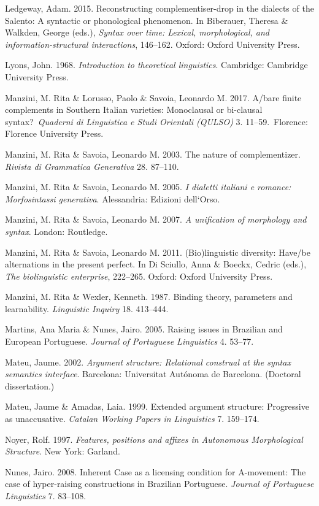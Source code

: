 \documentclass[output=paper]{langsci/langscibook}
\begin{document}
Ledgeway, Adam. 2015. Reconstructing complementiser-drop in the dialects of the Salento: A syntactic or phonological phenomenon. In Biberauer, Theresa \& Walkden, George (eds.), \textit{Syntax over time: Lexical, morphological, and information-structural interactions}, 146–162. Oxford: Oxford University Press.

Lyons, John. 1968. \textit{Introduction to theoretical linguistics}. Cambridge: Cambridge University Press.

Manzini, M. Rita \& Lorusso, Paolo \& Savoia, Leonardo M. 2017. A/bare finite complements in Southern Italian varieties: Monoclausal or bi-clausal syntax?~\textit{Quaderni di Linguistica e Studi Orientali (QULSO)} 3. 11–59.~Florence: Florence University Press.

Manzini, M. Rita \& Savoia, Leonardo M. 2003. The nature of complementizer. \textit{Rivista di Grammatica Generativa} 28. 87–110.

Manzini, M. Rita \& Savoia, Leonardo M. 2005. \textit{I dialetti italiani e romance: Morfosintassi generativa}. Alessandria: Edizioni dell‘Orso. 

Manzini, M. Rita \& Savoia, Leonardo M. 2007. \textit{A unification of morphology and syntax}. London: Routledge.

Manzini, M. Rita \& Savoia, Leonardo M. 2011. (Bio)linguistic diversity: Have/be alternations in the present perfect. In Di Sciullo, Anna \& Boeckx, Cedric (eds.), \textit{The biolinguistic enterprise}, 222–265. Oxford: Oxford University Press.

Manzini, M. Rita \& Wexler, Kenneth. 1987. Binding theory, parameters and learnability. \textit{Linguistic Inquiry} 18. 413–444.

Martins, Ana Maria \& Nunes, Jairo. 2005. Raising issues in Brazilian and European Portuguese. \textit{Journal of Portuguese Linguistics} 4. 53–77.

Mateu, Jaume. 2002. \textit{Argument structure: Relational construal at the syntax semantics interface}. Barcelona: Universitat Autónoma de Barcelona. (Doctoral dissertation.)

Mateu, Jaume \& Amadas, Laia. 1999. Extended argument structure: Progressive as unaccusative. \textit{Catalan Working Papers in Linguistics} 7. 159–174.

Noyer, Rolf. 1997. \textit{Features, positions and affixes in Autonomous Morphological Structure}. New York: Garland.

Nunes, Jairo. 2008. Inherent Case as a licensing condition for A-movement: The case of hyper-raising constructions in Brazilian Portuguese. \textit{Journal of Portuguese Linguistics} 7. 83–108.
\end{document}
